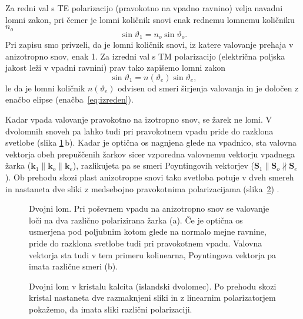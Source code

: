 Za redni val s TE polarizacijo (pravokotno na vpadno ravnino) velja navadni lomni zakon, pri čemer
je lomni količnik snovi enak rednemu lomnemu količniku $n_o$
\begin{equation}
\sin\vartheta_{1}=n_{o}\sin\vartheta_{o}.
\end{equation}
Pri zapisu smo privzeli, da je lomni količnik snovi, iz katere valovanje prehaja v anizotropno snov, 
enak 1. Za izredni val s TM polarizacijo (električna poljska jakost leži v vpadni ravnini) 
prav tako zapišemo lomni zakon
\begin{equation}
\sin\vartheta_{1}=n(\vartheta_e)\sin\vartheta_{e},
\end{equation}
le da je lomni količnik $n(\vartheta_e)$ odvisen od smeri širjenja valovanja in je določen z enačbo elipse
(enačba~\ref{eq:izreden}).

Kadar vpada valovanje pravokotno na izotropno snov, se žarek ne lomi. V 
dvolomnih snoveh pa lahko tudi pri pravokotnem vpadu pride do razklona svetlobe (slika
\ref{fig:dvolomnost}\,b). Kadar je optična os nagnjena glede na vpadnico, sta valovna vektorja
obeh prepuščenih žarkov sicer vzporedna valovnemu vektorju vpadnega žarka ($\mathbf{k}_1 \parallel
\mathbf{k}_o \parallel \mathbf{k}_e$), razlikujeta pa se smeri Poyntingovih vektorjev
($\mathbf{S}_1 \parallel \mathbf{S}_o \nparallel \mathbf{S}_e$). Ob prehodu skozi 
plast anizotropne snovi tako svetloba potuje v dveh smereh in nastaneta dve sliki 
z medsebojno pravokotnima polarizacijama (slika~\ref{foto:dvolom}) . 

\begin{figure}[h]
\centering
\def\svgwidth{140truemm} 

\caption{Dvojni lom. Pri poševnem vpadu na anizotropno snov se
valovanje loči na dva različno polarizirana žarka (a). Če je optična os 
usmerjena pod poljubnim kotom glede na normalo mejne ravnine, pride do razklona svetlobe
tudi pri pravokotnem vpadu. Valovna vektorja sta tudi v tem primeru kolinearna, 
Poyntingova vektorja pa imata različne smeri (b).}
\label{fig:dvolomnost}
\end{figure}

\begin{figure}[h]
\centering
\def\svgwidth{140truemm} 

\caption{Dvojni lom v kristalu kalcita (islandski dvolomec). 
Po prehodu skozi kristal nastaneta dve razmaknjeni sliki in z linearnim polarizatorjem 
pokažemo, da imata sliki različni polarizaciji.}
\label{foto:dvolom}
\end{figure}

